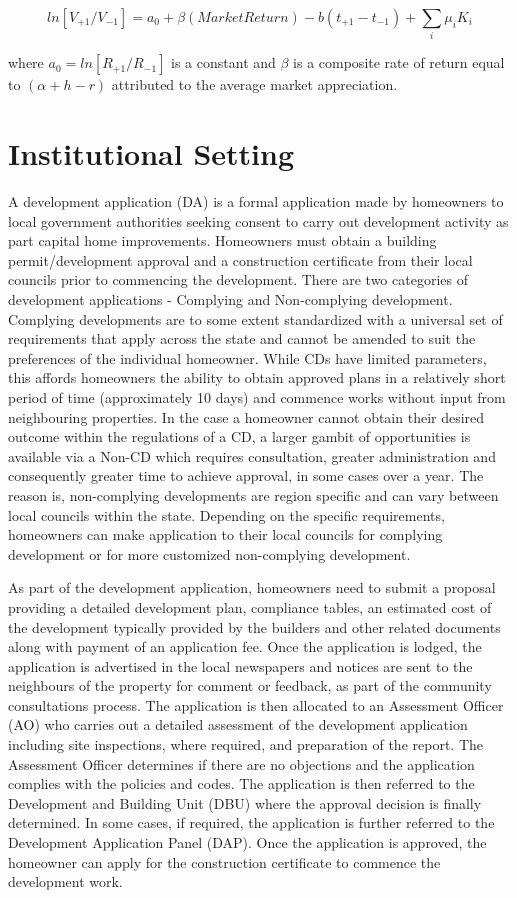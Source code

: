 \documentclass[AEJ,reqno, draftmode]{AEA} %
\begin{document}
\begin{equation} \label{eq:estimate}
    ln[V_{+1}/V_{-1}] = a_0 + \beta{(Market Return)} - b(t_{+1}-t_{-1}) + \sum_{i}\mu_i K_i
\end{equation}

where $a_0 = ln[R_{+1}/R_{-1}]$ is a constant and $\beta$ is a composite rate of return equal to $(\alpha+h-r)$ attributed to the average market appreciation.


\section{Institutional Setting}

A development application (DA) is a formal application made by homeowners to local government authorities seeking consent to carry out development activity as part capital home improvements. Homeowners must obtain a building permit/development approval and a construction certificate from their local councils prior to commencing the development. There are two categories of development applications - Complying and Non-complying development. Complying developments are to some extent standardized with a universal set of requirements that apply across the state and cannot be amended to suit the preferences of the individual homeowner. While CDs have limited parameters, this affords homeowners the ability to obtain approved plans in a relatively short period of time (approximately 10 days) and commence works without input from neighbouring properties. In the case a homeowner cannot obtain their desired outcome within the regulations of a CD, a larger gambit of opportunities is available via a Non-CD which requires consultation, greater administration and consequently greater time to achieve approval, in some cases over a year. The reason is, non-complying developments are region specific and can vary between local councils within the state. Depending on the specific requirements, homeowners can make application to their local councils for complying development or for more customized non-complying development.

As part of the development application, homeowners need to submit a proposal providing a detailed development plan, compliance tables, an estimated cost of the development typically provided by the builders and other related documents along with payment of an application fee. Once the application is lodged, the application is advertised in the local newspapers and notices are sent to the neighbours of the property for comment or feedback, as part of the community consultations process. The application is then allocated to an Assessment Officer (AO) who carries out a detailed assessment of the development application including site inspections, where required, and preparation of the report. The Assessment Officer determines if there are no objections and the application complies with the policies and codes. The application is then referred to the Development and Building Unit (DBU) where the approval decision is finally determined. In some cases, if required, the application is further referred to the Development Application Panel (DAP). Once the application is approved, the homeowner can apply for the construction certificate to commence the development work.
\end{document}
